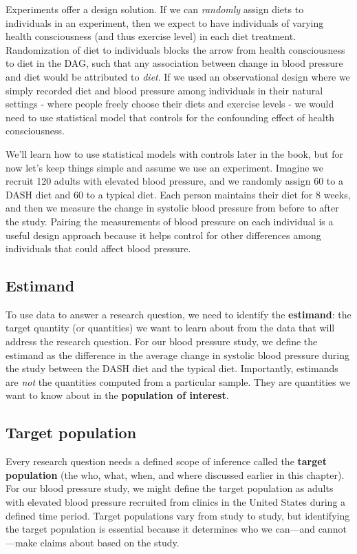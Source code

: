 \documentclass[
]{book}
\begin{document}
Experiments offer a design solution. If we can \emph{randomly} assign diets to individuals in an experiment, then we expect to have individuals of varying health consciousness (and thus exercise level) in each diet treatment. Randomization of diet to individuals blocks the arrow from health consciousness to diet in the DAG, such that any association between change in blood pressure and diet would be attributed to \emph{diet}. If we used an observational design where we simply recorded diet and blood pressure among individuals in their natural settings - where people freely choose their diets and exercise levels - we would need to use statistical model that controls for the confounding effect of health consciousness.

We'll learn how to use statistical models with controls later in the book, but for now let's keep things simple and assume we use an experiment. Imagine we recruit 120 adults with elevated blood pressure, and we randomly assign 60 to a DASH diet and 60 to a typical diet. Each person maintains their diet for 8 weeks, and then we measure the change in systolic blood pressure from before to after the study. Pairing the measurements of blood pressure on each individual is a useful design approach because it helps control for other differences among individuals that could affect blood pressure.

\subsection{Estimand}\label{estimand}

To use data to answer a research question, we need to identify the \textbf{estimand}: the target quantity (or quantities) we want to learn about from the data that will address the research question. For our blood pressure study, we define the estimand as the difference in the average change in systolic blood pressure during the study between the DASH diet and the typical diet. Importantly, estimands are \emph{not} the quantities computed from a particular sample. They are quantities we want to know about in the \textbf{population of interest}.

\subsection{Target population}\label{target-population}

Every research question needs a defined scope of inference called the \textbf{target population} (the who, what, when, and where discussed earlier in this chapter). For our blood pressure study, we might define the target population as adults with elevated blood pressure recruited from clinics in the United States during a defined time period. Target populations vary from study to study, but identifying the target population is essential because it determines who we can---and cannot---make claims about based on the study.
\end{document}

